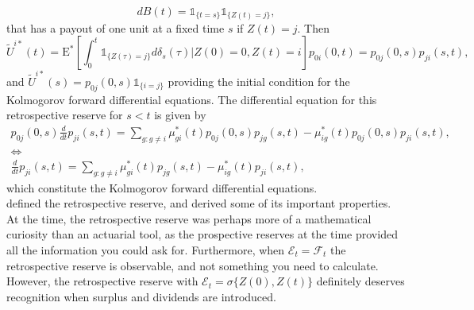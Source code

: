 \documentclass[12pt]{article}
\newcommand{\E}{\text{E}}
\newcommand{\indic}[1]{\mathds{1}_{ \{ #1 \} }}
\theoremstyle{my_thm}
\begin{document}
$$
dB(t)=\indic{t=s}\indic{Z(t)=j},
$$
that has a payout of one unit at a fixed time $s$ if $Z(t)=j$. Then 
$$
\tilde{U}^{i*}(t)=\E^* \left[ \int_0^t  \indic{Z(\tau)=j} d\delta_{s}(\tau) |Z(0)=0, Z(t)=i \right] p_{0i}(0,t) = p_{0j}(0,s)p_{ji}(s,t),
$$
and $\tilde{U}^{i*}(s)=p_{0j}(0,s)\indic{i=j}$ providing the initial condition for the Kolmogorov forward differential equations. The differential equation for this retrospective reserve for $s<t$ is given by 
\begin{gather*}
p_{0j}(0,s)\frac{d}{dt}p_{ji}(s,t)= \sum_{g:g\neq i} \mu^*_{gi}(t)p_{0j}(0,s)p_{jg}(s,t)- \mu^*_{ig}(t)p_{0j}(0,s)p_{ji}(s,t),
\\
\Leftrightarrow
\\
\frac{d}{dt}p_{ji}(s,t)= \sum_{g:g\neq i} \mu^*_{gi}(t)p_{jg}(s,t)- \mu^*_{ig}(t)p_{ji}(s,t),
\end{gather*}
which constitute the Kolmogorov forward differential equations. 
\\[12pt]
\citet{Norberg} defined the retrospective reserve, and derived some of its important properties. At the time, the retrospective reserve was perhaps more of a mathematical curiosity than an actuarial tool, as the prospective reserves at the time provided all the information you could ask for. Furthermore, when $\mathcal{E}_t=\mathcal{F}_t$ the retrospective reserve is observable, and not something you need to calculate. However, the retrospective reserve with $\mathcal{E}_t=\sigma \{Z(0),Z(t)\}$ definitely deserves recognition when surplus and dividends are introduced.
\end{document}
